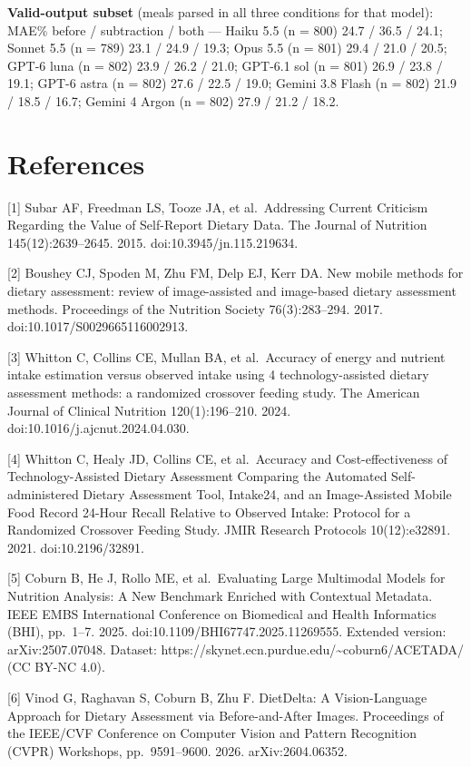 \documentclass[
  11pt,
  letterpaper]{article}
\begin{document}
\textbf{Valid-output subset} (meals parsed in all three conditions for that model): MAE\% before / subtraction
/ both --- Haiku 5.5 (n = 800) 24.7 / 36.5 / 24.1; Sonnet 5.5 (n = 789) 23.1 / 24.9 / 19.3; Opus 5.5 (n = 801)
29.4 / 21.0 / 20.5; GPT-6 luna (n = 802) 23.9 / 26.2 / 21.0; GPT-6.1 sol (n = 801) 26.9 / 23.8 / 19.1; GPT-6
astra (n = 802) 27.6 / 22.5 / 19.0; Gemini 3.8 Flash (n = 802) 21.9 / 18.5 / 16.7; Gemini 4 Argon (n = 802)
27.9 / 21.2 / 18.2.

\section*{References}\label{references}

{[}1{]} Subar AF, Freedman LS, Tooze JA, et al.~Addressing Current Criticism Regarding the Value of
Self-Report Dietary Data. The Journal of Nutrition 145(12):2639--2645. 2015. doi:10.3945/jn.115.219634.

{[}2{]} Boushey CJ, Spoden M, Zhu FM, Delp EJ, Kerr DA. New mobile methods for dietary assessment: review of
image-assisted and image-based dietary assessment methods. Proceedings of the Nutrition Society
76(3):283--294. 2017. doi:10.1017/S0029665116002913.

{[}3{]} Whitton C, Collins CE, Mullan BA, et al.~Accuracy of energy and nutrient intake estimation versus
observed intake using 4 technology-assisted dietary assessment methods: a randomized crossover feeding study.
The American Journal of Clinical Nutrition 120(1):196--210. 2024. doi:10.1016/j.ajcnut.2024.04.030.

{[}4{]} Whitton C, Healy JD, Collins CE, et al.~Accuracy and Cost-effectiveness of Technology-Assisted Dietary
Assessment Comparing the Automated Self-administered Dietary Assessment Tool, Intake24, and an Image-Assisted
Mobile Food Record 24-Hour Recall Relative to Observed Intake: Protocol for a Randomized Crossover Feeding
Study. JMIR Research Protocols 10(12):e32891. 2021. doi:10.2196/32891.

{[}5{]} Coburn B, He J, Rollo ME, et al.~Evaluating Large Multimodal Models for Nutrition Analysis: A New
Benchmark Enriched with Contextual Metadata. IEEE EMBS International Conference on Biomedical and Health
Informatics (BHI), pp.~1--7. 2025. doi:10.1109/BHI67747.2025.11269555. Extended version: arXiv:2507.07048.
Dataset: https://skynet.ecn.purdue.edu/\textasciitilde coburn6/ACETADA/ (CC BY-NC 4.0).

{[}6{]} Vinod G, Raghavan S, Coburn B, Zhu F. DietDelta: A Vision-Language Approach for Dietary Assessment via
Before-and-After Images. Proceedings of the IEEE/CVF Conference on Computer Vision and Pattern Recognition
(CVPR) Workshops, pp.~9591--9600. 2026. arXiv:2604.06352.
\end{document}

